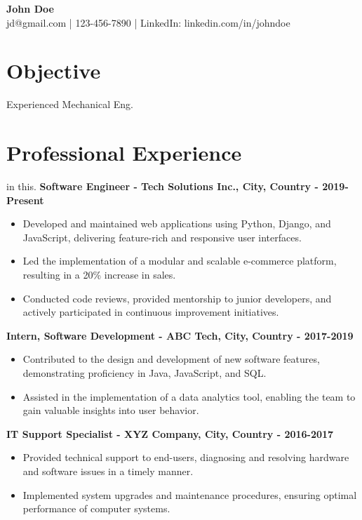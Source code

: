 \documentclass[a4paper,10pt]{article}
\begin{document}
\pagestyle{empty}

\begin{center}
    \textbf{\LARGE {John} {Doe}} \\
    {jd@gmail.com} | {123-456-7890} | LinkedIn: {linkedin.com/in/johndoe}
\end{center}

\section*{Objective}
{
Experienced Mechanical Eng.}

\section*{Professional Experience}
{ in this.
\textbf{Software Engineer - Tech Solutions Inc., City, Country - 2019-Present}

\begin{itemize}
    \item Developed and maintained web applications using Python, Django, and JavaScript, delivering feature-rich and responsive user interfaces.
    \item Led the implementation of a modular and scalable e-commerce platform, resulting in a 20\% increase in sales.
    \item Conducted code reviews, provided mentorship to junior developers, and actively participated in continuous improvement initiatives.
\end{itemize}

\textbf{Intern, Software Development - ABC Tech, City, Country - 2017-2019}

\begin{itemize}
    \item Contributed to the design and development of new software features, demonstrating proficiency in Java, JavaScript, and SQL.
    \item Assisted in the implementation of a data analytics tool, enabling the team to gain valuable insights into user behavior.
\end{itemize}

\textbf{IT Support Specialist - XYZ Company, City, Country - 2016-2017}

\begin{itemize}
    \item Provided technical support to end-users, diagnosing and resolving hardware and software issues in a timely manner.
    \item Implemented system upgrades and maintenance procedures, ensuring optimal performance of computer systems.
\end{itemize}}
\end{document}
